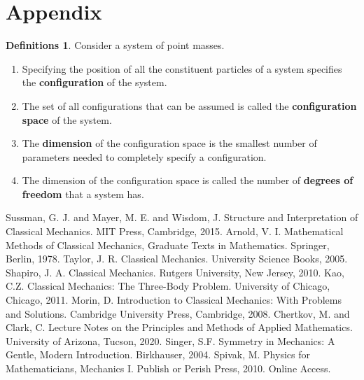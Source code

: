 \documentclass[10pt, psamsfonts]{amsart}
\theoremstyle{definition}
\newtheorem{defns}[thm]{Definitions}
\theoremstyle{remark}
\numberwithin{equation}{section}
\begin{document}
\newpage
\section{Appendix}
\begin{defns}
    \label{def: Configuration Space}
  Consider a system of point masses. 
  \begin{enumerate}
    \item Specifying the position of all the constituent particles of a system specifies the \textbf{configuration} of the system.
    \item The set of all configurations that can be assumed is called the \textbf{configuration space} of the system.
    \item The \textbf{dimension} of the configuration space is the smallest number of parameters needed to completely specify a configuration.
    \item The dimension of the configuration space is called the number of \textbf{degrees of freedom} that a system has.
  \end{enumerate}
\end{defns}

\begin{thebibliography}{9}
 \label{b1}
        Sussman, G. J. and Mayer, M. E. and Wisdom, J. Structure and Interpretation of Classical Mechanics. MIT Press, Cambridge, 2015. 
 \label{b2}
        Arnold, V. I. Mathematical Methods of Classical Mechanics, Graduate Texts in Mathematics. Springer, Berlin, 1978.
 \label{b2}
        Taylor, J. R. Classical Mechanics. University Science Books, 2005.
 \label{bh}
        Shapiro, J. A. Classical Mechanics. Rutgers University, New Jersey, 2010.
 \label{b3}
        Kao, C.Z. Classical Mechanics: The Three-Body Problem. University of Chicago, Chicago, 2011.
 \label{b4}
        Morin, D. Introduction to Classical Mechanics: With Problems and Solutions. Cambridge University Press, Cambridge, 2008.
 \label{b5}
        Chertkov, M. and Clark, C. Lecture Notes on the Principles and Methods of Applied Mathematics. University of Arizona, Tucson, 2020.
 \label{b5}
        Singer, S.F. Symmetry in Mechanics: A Gentle, Modern Introduction. Birkhauser, 2004.
        Spivak, M. Physics for Mathematicians, Mechanics I. Publish or Perish Press, 2010. Online Access.
\end{thebibliography}
\end{document}
